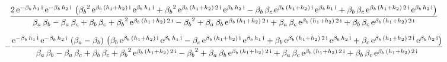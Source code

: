 \documentclass[9pt]{article}
\begin{document}
  \begin{equation}
    \centering
    \frac{2\, \mathrm{e}^{- \mathrm{\beta}_{b}\, h_{1}\, \mathrm{i}}\, \mathrm{e}^{- \mathrm{\beta}_{b}\, h_{2}\, \mathrm{i}}\, \left({\mathrm{\beta}_{b}}^2\, \mathrm{e}^{\mathrm{\beta}_{b}\, \left(h_{1} + h_{2}\right)\, \mathrm{i}}\, \mathrm{e}^{\mathrm{\beta}_{b}\, h_{1}\, \mathrm{i}} + {\mathrm{\beta}_{b}}^2\, \mathrm{e}^{\mathrm{\beta}_{b}\, \left(h_{1} + h_{2}\right)\, 2\, \mathrm{i}}\, \mathrm{e}^{\mathrm{\beta}_{b}\, h_{2}\, \mathrm{i}} - \mathrm{\beta}_{b}\, \mathrm{\beta}_{c}\, \mathrm{e}^{\mathrm{\beta}_{b}\, \left(h_{1} + h_{2}\right)\, \mathrm{i}}\, \mathrm{e}^{\mathrm{\beta}_{b}\, h_{1}\, \mathrm{i}} + \mathrm{\beta}_{b}\, \mathrm{\beta}_{c}\, \mathrm{e}^{\mathrm{\beta}_{b}\, \left(h_{1} + h_{2}\right)\, 2\, \mathrm{i}}\, \mathrm{e}^{\mathrm{\beta}_{b}\, h_{2}\, \mathrm{i}}\right)}{\mathrm{\beta}_{a}\, \mathrm{\beta}_{b} - \mathrm{\beta}_{a}\, \mathrm{\beta}_{c} + \mathrm{\beta}_{b}\, \mathrm{\beta}_{c} + {\mathrm{\beta}_{b}}^2\, \mathrm{e}^{\mathrm{\beta}_{b}\, \left(h_{1} + h_{2}\right)\, 2\, \mathrm{i}} - {\mathrm{\beta}_{b}}^2 + \mathrm{\beta}_{a}\, \mathrm{\beta}_{b}\, \mathrm{e}^{\mathrm{\beta}_{b}\, \left(h_{1} + h_{2}\right)\, 2\, \mathrm{i}} + \mathrm{\beta}_{a}\, \mathrm{\beta}_{c}\, \mathrm{e}^{\mathrm{\beta}_{b}\, \left(h_{1} + h_{2}\right)\, 2\, \mathrm{i}} + \mathrm{\beta}_{b}\, \mathrm{\beta}_{c}\, \mathrm{e}^{\mathrm{\beta}_{b}\, \left(h_{1} + h_{2}\right)\, 2\, \mathrm{i}}}
    \label{eq:X1}
  \end{equation}

  \begin{equation}
    \centering
    -\frac{\mathrm{e}^{- \mathrm{\beta}_{b}\, h_{1}\, \mathrm{i}}\, \mathrm{e}^{- \mathrm{\beta}_{b}\, h_{2}\, \mathrm{i}}\, \left(\mathrm{\beta}_{a} - \mathrm{\beta}_{b}\right)\, \left(\mathrm{\beta}_{b}\, \mathrm{e}^{\mathrm{\beta}_{b}\, \left(h_{1} + h_{2}\right)\, \mathrm{i}}\, \mathrm{e}^{\mathrm{\beta}_{b}\, h_{1}\, \mathrm{i}} - \mathrm{\beta}_{c}\, \mathrm{e}^{\mathrm{\beta}_{b}\, \left(h_{1} + h_{2}\right)\, \mathrm{i}}\, \mathrm{e}^{\mathrm{\beta}_{b}\, h_{1}\, \mathrm{i}} + \mathrm{\beta}_{b}\, \mathrm{e}^{\mathrm{\beta}_{b}\, \left(h_{1} + h_{2}\right)\, 2\, \mathrm{i}}\, \mathrm{e}^{\mathrm{\beta}_{b}\, h_{2}\, \mathrm{i}} + \mathrm{\beta}_{c}\, \mathrm{e}^{\mathrm{\beta}_{b}\, \left(h_{1} + h_{2}\right)\, 2\, \mathrm{i}}\, \mathrm{e}^{\mathrm{\beta}_{b}\, h_{2}\, \mathrm{i}}\right)}{\mathrm{\beta}_{a}\, \mathrm{\beta}_{b} - \mathrm{\beta}_{a}\, \mathrm{\beta}_{c} + \mathrm{\beta}_{b}\, \mathrm{\beta}_{c} + {\mathrm{\beta}_{b}}^2\, \mathrm{e}^{\mathrm{\beta}_{b}\, \left(h_{1} + h_{2}\right)\, 2\, \mathrm{i}} - {\mathrm{\beta}_{b}}^2 + \mathrm{\beta}_{a}\, \mathrm{\beta}_{b}\, \mathrm{e}^{\mathrm{\beta}_{b}\, \left(h_{1} + h_{2}\right)\, 2\, \mathrm{i}} + \mathrm{\beta}_{a}\, \mathrm{\beta}_{c}\, \mathrm{e}^{\mathrm{\beta}_{b}\, \left(h_{1} + h_{2}\right)\, 2\, \mathrm{i}} + \mathrm{\beta}_{b}\, \mathrm{\beta}_{c}\, \mathrm{e}^{\mathrm{\beta}_{b}\, \left(h_{1} + h_{2}\right)\, 2\, \mathrm{i}}}
    \label{eq:X2}
  \end{equation}
\end{document}
